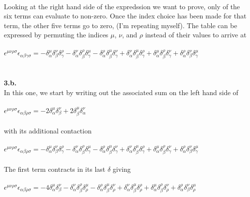 \documentclass[prb,preprint]
{revtex4-1}
\newcommand{\PRLsep}{\noindent\makebox[\linewidth]{\resizebox{0.8888\linewidth}{2pt}{$\bullet$}}\bigskip}
\begin{document}
\\
Looking at the right hand side of the expredssion we want to prove, only of the six terms can evaluate to non-zero.  Once the index choice has been made for that term, the other five terms go to zero, (I'm repeating myself).  The table can be expressed by permuting the indices $\mu$, $\nu$, and $\rho$ instead of their values to arrive at
\\
\\
$\epsilon^{\mu\nu\rho\sigma}\epsilon_{\alpha\beta\gamma\sigma} = -\delta^\mu_\alpha \delta^\nu_\beta \delta^\rho_\gamma - \delta^\nu_\alpha \delta^\rho_\beta \delta^\mu_\gamma - \delta^\rho_\alpha \delta^\mu_\beta \delta^\nu_\gamma + \delta^\nu_\alpha \delta^\mu_\beta \delta^\rho_\gamma + \delta^\mu_\alpha \delta^\rho_\beta \delta^\nu_\gamma + \delta^\rho_\alpha \delta^\nu_\beta \delta^\mu_\gamma$
\\
\PRLsep
\\
\\
\textbf{3.b.}
\\
In this one,  we start by writing out the associated sum on the left hand side of 
\\
\\
$\epsilon^{\mu\nu\rho\sigma}\epsilon_{\alpha\beta\rho\sigma} = -2\delta^\mu_\alpha\delta^\nu_\beta + 2\delta^\mu_\beta\delta^\nu_\alpha$
\\
\\
with its additional contaction
\\
\\
$\epsilon^{\mu\nu\rho\sigma}\epsilon_{\alpha\beta\rho\sigma} = -\delta^\mu_\alpha \delta^\nu_\beta \delta^\rho_\gamma - \delta^\nu_\alpha \delta^\rho_\beta \delta^\mu_\gamma - \delta^\rho_\alpha \delta^\mu_\beta \delta^\nu_\gamma + \delta^\nu_\alpha \delta^\mu_\beta \delta^\rho_\gamma + \delta^\mu_\alpha \delta^\rho_\beta \delta^\nu_\gamma + \delta^\rho_\alpha \delta^\nu_\beta \delta^\mu_\gamma$
\\
\\
The first term contracts in its last $\delta$ giving 
\\
\\
$\epsilon^{\mu\nu\rho\sigma}\epsilon_{\alpha\beta\rho\sigma} = -4\delta^\mu_\alpha \delta^\nu_\beta - \delta^\nu_\alpha \delta^\rho_\beta \delta^\mu_\rho - \delta^\rho_\alpha \delta^\mu_\beta \delta^\nu_\rho + \delta^\nu_\alpha \delta^\mu_\beta \delta^\rho_\rho + \delta^\mu_\alpha \delta^\rho_\beta \delta^\nu_\rho + \delta^\rho_\alpha \delta^\nu_\beta \delta^\mu_\rho$
\\
\end{document}
